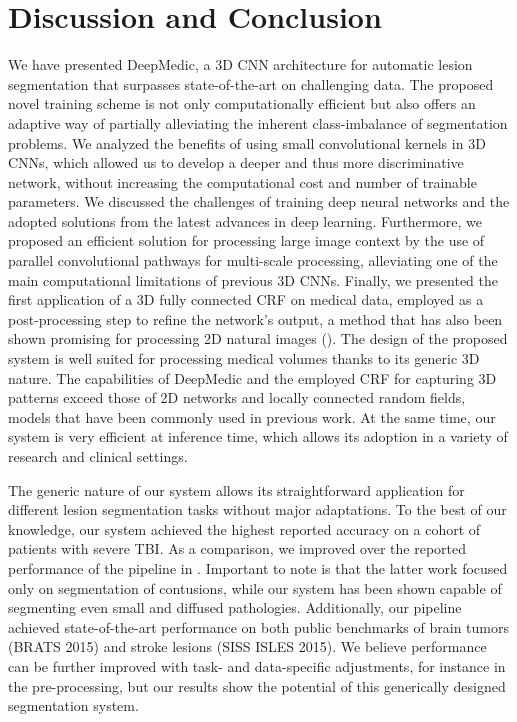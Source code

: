 


\section{Discussion and Conclusion}
\label{sec:discussion}



We have presented DeepMedic, a 3D CNN architecture for automatic lesion segmentation that surpasses state-of-the-art on challenging data. The proposed novel training scheme is not only computationally efficient but also offers an adaptive way of partially alleviating the inherent class-imbalance of segmentation problems. We analyzed the benefits of using small convolutional kernels in 3D CNNs, which allowed us to develop a deeper and thus more discriminative network, without increasing the computational cost and number of trainable parameters. We discussed the challenges of training deep neural networks and the adopted solutions from the latest advances in deep learning. Furthermore, we proposed an efficient solution for processing large image context by the use of parallel convolutional pathways for multi-scale processing, alleviating one of the main computational limitations of previous 3D CNNs. Finally, we presented the first application of a 3D fully connected CRF on medical data, employed as a post-processing step to refine the network's output, a method that has also been shown promising for processing 2D natural images (\cite{chen2014semantic}). The design of the proposed system is well suited for processing medical volumes thanks to its generic 3D nature. The capabilities of DeepMedic and the employed CRF for capturing 3D patterns exceed those of 2D networks and locally connected random fields, models that have been commonly used in previous work. At the same time, our system is very efficient at inference time, which allows its adoption in a variety of research and clinical settings.

The generic nature of our system allows its straightforward application for different lesion segmentation tasks without major adaptations. To the best of our knowledge, our system achieved the highest reported accuracy on a cohort of patients with severe TBI. As a comparison, we improved over the reported performance of the pipeline in \cite{Rao2014b}. Important to note is that the latter work focused only on segmentation of contusions, while our system has been shown capable of segmenting even small and diffused pathologies. Additionally, our pipeline achieved state-of-the-art performance on both public benchmarks of brain tumors (BRATS 2015) and stroke lesions (SISS ISLES 2015). We believe performance can be further improved with task- and data-specific adjustments, for instance in the pre-processing, but our results show the potential of this generically designed segmentation system.

